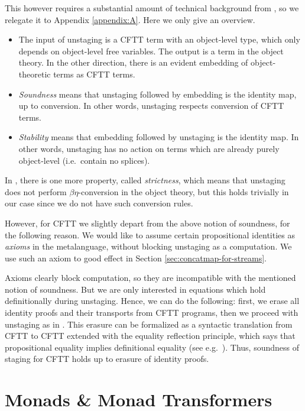 \documentclass[acmsmall]{acmart}
\theoremstyle{remark}
\begin{document}
This however requires a substantial amount of technical background from
\cite{staged2ltt}, so we relegate it to Appendix \ref{appendix:A}. Here we only
give an overview.
\begin{itemize}
\item The input of unstaging is a CFTT term with an object-level type, which
      only depends on object-level free variables. The output is a term in the
      object theory. In the other direction, there is an evident embedding of
      object-theoretic terms as CFTT terms.
\item \emph{Soundness} means that unstaging followed by embedding is the
      identity map, up to conversion. In other words, unstaging respects conversion
      of CFTT terms.
\item \emph{Stability} means that embedding followed by unstaging is the
      identity map. In other words, unstaging has no action on terms which are
      already purely object-level (i.e.\ contain no splices).
\end{itemize}
In \cite{staged2ltt}, there is one more property, called \emph{strictness},
which means that unstaging does not perform $\beta\eta$-conversion in the
object theory, but this holds trivially in our case since we do not have such
conversion rules.

However, for CFTT we slightly depart from the above notion of soundness, for the
following reason. We would like to assume certain propositional identities as
\emph{axioms} in the metalanguage, without blocking unstaging as a
computation. We use such an axiom to good effect in Section
\ref{sec:concatmap-for-streams}.

Axioms clearly block computation, so they are incompatible with the mentioned
notion of soundness. But we are only interested in equations which hold
definitionally during unstaging. Hence, we can do the following: first, we erase
all identity proofs and their transports from CFTT programs, then we proceed
with unstaging as in \cite{staged2ltt}. This erasure can be formalized as a
syntactic translation \cite{next700} from CFTT to CFTT extended with the
equality reflection principle, which says that propositional equality implies
definitional equality (see e.g.\ \cite{hofmann95conservativity}). Thus,
soundness of staging for CFTT holds up to erasure of identity proofs.

\section{Monads \& Monad Transformers}\label{sec:monad-transformers}
\end{document}
